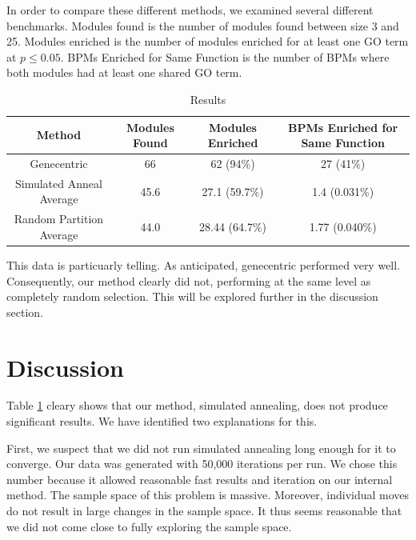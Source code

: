 \documentclass[11pt]{article}
\begin{document}
\par In order to compare these different methods, we examined several different benchmarks. Modules found is the number of modules found between size 3 and 25. Modules enriched is the number of modules enriched for at least one GO term at  $p \leq 0.05 $. BPMs Enriched for Same Function is the number of BPMs where both modules had at least one shared GO term.




\begin{table}
    \begin{center}
       \begin{tabular}{ |c | c |c| c | } 
 \hline
 Method & Modules Found & Modules Enriched & BPMs Enriched for Same Function \\
	\hline
 Genecentric              & 66 & 62 (94\%) & 27 (41\%)\\ 
	\hline 
 Simulated Anneal Average & 45.6 & 27.1 (59.7\%) & 1.4 (0.031\%)\\ 
 \hline
 Random Partition Average & 44.0 & 28.44 (64.7\%) & 1.77 (0.040\%)\\ 
 \hline
\end{tabular}
        \caption{Results}\label{tab:results}
    \end{center}
\end{table}
\par This data is particuarly telling. As anticipated, genecentric performed very well. Consequently, our method clearly did not, performing at the same level as completely random selection. This will be explored further in the discussion section.



\section{Discussion}
\par Table \ref{tab:results} cleary shows that our method, simulated annealing, does not produce significant results. We have identified two explanations for this.

\par First, we suspect that we did not run simulated annealing long enough for it to converge. Our data was generated with 50,000 iterations per run. We chose this number because it allowed reasonable fast results and iteration on our internal method. The sample space of this problem is massive. Moreover, individual moves do not result in large changes in the sample space. It thus seems reasonable that we did not come close to fully exploring the sample space.
\end{document}
